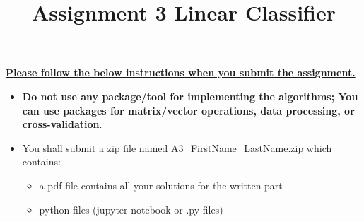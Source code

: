 \documentclass{exam}
\title{Assignment 3 Linear Classifier}
\date{}
\begin{document}
\maketitle
\thispagestyle{headandfoot}

\begin{center}
  {}
\end{center}
\vspace{.5cm}

\underline{\bf Please follow the below instructions when you submit the assignment.}
\begin{itemize}
\item \textbf{Do not use any package/tool for implementing the algorithms; You can use packages for matrix/vector operations,  data processing,  or cross-validation}.
\item 
You shall submit a zip file named A3\_FirstName\_LastName.zip which contains:
\begin{itemize}
  \item a pdf file contains all your solutions for the written part
  \item python files (jupyter notebook or .py files)
\end{itemize}
\end{itemize}
\vspace{.5cm}
\end{document}
